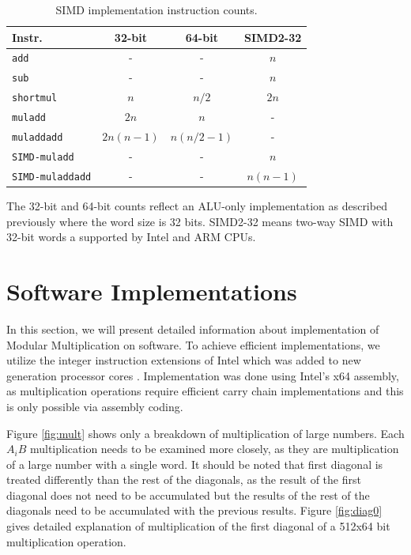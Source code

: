 \documentclass[twocolumn]{svjour3}          %
\begin{document}
\begin{table}
\caption{SIMD implementation instruction counts.}
\label{simdCounts}
\begin{tabular}{|l||c|c|c|} \hline
Instr. & 32-bit & 64-bit & SIMD2-32 \\
\hline\hline
\texttt{add} & - & - & $n$ \\
\texttt{sub} & - & - & $n$ \\
\texttt{shortmul} & $n$ & $n/2$ & $2n$ \\
\texttt{muladd} & $2n$ & $n$ & - \\
\texttt{muladdadd} & $2n(n-1)$ & $n(n/2-1)$ & - \\
\texttt{SIMD-muladd} & - & - & $n$ \\
\texttt{SIMD-muladdadd} & - & - & $n(n-1)$ \\
\hline
\end{tabular}
\end{table}
%
\noindent
The 32-bit and 64-bit counts reflect an ALU-only implementation as described previously where the word size is 32 bits.
SIMD2-32 means two-way SIMD with 32-bit words a supported by Intel and ARM CPUs.

\section{Software Implementations}
\label{sec:softimp}

In this section, we will present detailed information about implementation of Modular Multiplication on software. To achieve efficient implementations, we utilize the integer instruction extensions of Intel which was added to new generation processor cores \cite{largeint}. Implementation was done using Intel's x64 assembly, as multiplication operations require efficient carry chain implementations and this is only possible via assembly coding.  

Figure \ref{fig:mult} shows only a breakdown of multiplication of large numbers. Each $A_iB$ multiplication needs to be examined more closely, as they are multiplication of a large number with a single word. It should be noted that first diagonal is treated differently than the rest of the diagonals, as the result of the first diagonal does not need to be accumulated but the results of the rest of the diagonals need to be accumulated with the previous results. Figure \ref{fig:diag0} gives detailed explanation of multiplication of the first diagonal of a 512x64 bit multiplication operation.
\end{document}

